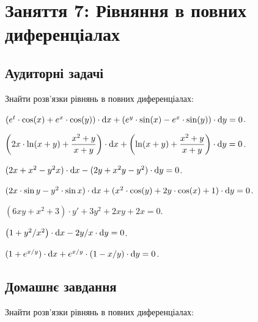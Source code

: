 \section*{Заняття 7: Рівняння в повних диференціалах}

\subsection*{Аудиторні задачі}

Знайти розв'язки рівнянь в повних диференціалах:

\begin{problem}
	$(e^t \cdot \cos (x) + e^x \cdot \cos (y)) \cdot \mathop{}\!\mathrm{d} x + (e^y \cdot \sin (x) - e^x \cdot \sin (y)) \cdot \mathop{}\!\mathrm{d} y = 0$.
\end{problem}

\begin{problem}
	$\left( 2 x \cdot \ln (x + y) + \dfrac{x^2 + y}{x + y} \right) \cdot \mathop{}\!\mathrm{d} x + \left( \ln (x + y) + \dfrac{x^2 + y}{x + y} \right) \cdot \mathop{}\!\mathrm{d} y = 0$.
\end{problem}

\begin{problem}
	$(2 x + x^2 - y^2 x) \cdot \mathop{}\!\mathrm{d} x - (2 y + x^2 y - y^2) \cdot \mathop{}\!\mathrm{d} y = 0$.
\end{problem}

\begin{problem}
	$(2 x \cdot \sin y - y^2 \cdot \sin x) \cdot \mathop{}\!\mathrm{d} x + (x^2 \cdot \cos (y) + 2 y \cdot \cos (x) + 1) \cdot \mathop{}\!\mathrm{d} y = 0$.
\end{problem}

\begin{problem}
	$(6 x y + x^2 + 3) \cdot y' + 3 y^2 + 2 x y + 2 x = 0$.
\end{problem}

\begin{problem}
	$\left( 1 + y^2 / x^2 \right) \cdot \mathop{}\!\mathrm{d} x - 2 y / x \cdot \mathop{}\!\mathrm{d} y = 0$.
\end{problem}

\begin{problem}
	$(1 + e^{x / y}) \cdot \mathop{}\!\mathrm{d} x + e^{x / y} \cdot (1 - x / y) \cdot \mathop{}\!\mathrm{d} y = 0$.
\end{problem}

\subsection*{Домашнє завдання}

Знайти розв'язки рівнянь в повних диференціалах:

